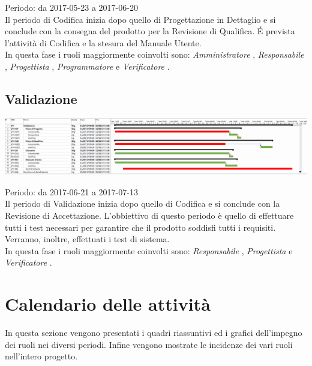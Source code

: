 Periodo: da 2017-05-23 a 2017-06-20 \\
Il periodo di Codifica inizia dopo quello di Progettazione in Dettaglio e si conclude
con la consegna del prodotto per la Revisione di Qualifica. \'E prevista l'attività di
Codifica e la stesura del Manuale Utente. \\
In questa fase i ruoli maggiormente coinvolti sono:  \emph{Amministratore} ,  \emph{Responsabile} ,
 \emph{Progettista} ,  \emph{Programmatore}  e  \emph{Verificatore} .

\subsection{Validazione}

\begin{center}
  \includegraphics[scale=0.25]{img/6-VA.png}
\end{center}

Periodo: da 2017-06-21 a 2017-07-13 \\
Il periodo di Validazione inizia dopo quello di Codifica e si conclude con la Revisione
di Accettazione.
L'obbiettivo di questo periodo è quello di effettuare tutti i test necessari per garantire
che il prodotto soddisfi tutti i requisiti. Verranno, inoltre, effettuati i test di sistema. \\
In questa fase i ruoli maggiormente coinvolti sono:  \emph{Responsabile} ,  \emph{Progettista} 
e  \emph{Verificatore} .

\section{Calendario delle attività}
In questa sezione vengono presentati i quadri riassuntivi ed i grafici dell’impegno dei ruoli nei diversi periodi. Infine vengono mostrate le incidenze dei vari ruoli nell’intero progetto.


